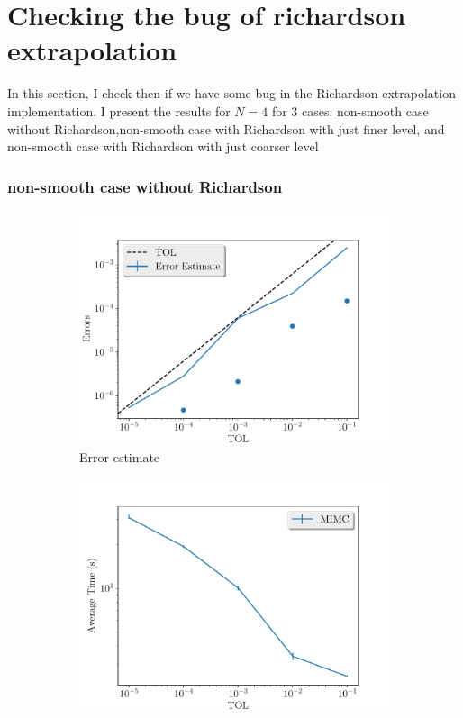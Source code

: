 \documentclass[11pt]{article}
\begin{document}
\section{Checking the bug of richardson extrapolation}
In this section, I check then if we have some bug in the Richardson extrapolation implementation, I present the results for $N=4$ for 3 cases: non-smooth case without Richardson,non-smooth case with Richardson with just finer level, and non-smooth case with Richardson with just coarser level



\subsubsection*{non-smooth case without Richardson}


\begin{figure}[!h]
	\centering
	\begin{subfigure}{.5\textwidth}
		\centering
		\includegraphics[width=1\linewidth]{./figures/1D_BS_4_steps_non_smooth/error_estimate.pdf}
		\caption{Error estimate}
		\label{fig:misc_1D_BS_non_smooth_4steps_sub1}
	\end{subfigure}%
	\begin{subfigure}{.5\textwidth}
		\centering
		\includegraphics[width=1\linewidth]{./figures/1D_BS_4_steps_non_smooth/average_running_time.pdf}

\end{subfigure}
\end{figure}
\end{document}
